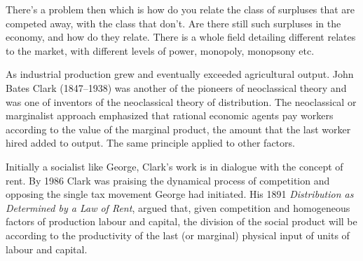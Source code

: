 There's a problem then which is how do you relate the class of surpluses that are competed away, with the class that don't. Are there still such surpluses in the economy, and how do they relate. There is a whole field detailing different relates to the market, with different levels of power, \gls{monopoly}, \gls{monopsony} etc. 





As industrial production grew and eventually exceeded agricultural output. 
John Bates Clark (1847--1938) was another of the pioneers of neoclassical theory and was one of inventors of the neoclassical theory of  distribution.  The neoclassical or marginalist approach emphasized that rational economic agents pay workers according to the value of the marginal product, the amount that the last worker hired added to output. %
The same principle applied to other factors.   

Initially a socialist like George,  %
Clark's work is in dialogue with the concept of rent. 
By 1986 Clark was praising the dynamical process of competition and opposing the single tax movement George had initiated.  His 1891 \textit{Distribution as Determined by a Law of Rent}, \cite{clarkDistributionDeterminedLaw1891} argued that, given  competition and homogeneous factors of production labour and capital, the division of the social product will be according to the productivity of the last (or marginal) physical input of units of labour and capital.


